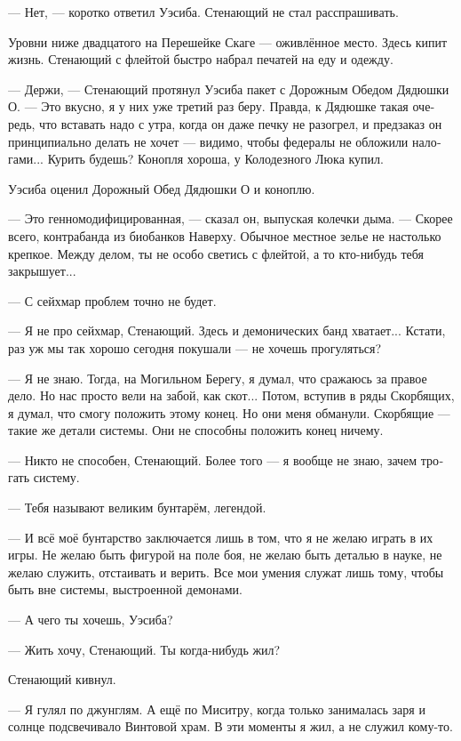 \documentclass[a4paper,12pt,fleqn]{book}\usepackage{cooltooltips}\usepackage{polyglossia}\setdefaultlanguage[babelshorthands=true]{russian}\setotherlanguage{english}\defaultfontfeatures{Ligatures=TeX,Mapping=tex-text} \usepackage{xcolor}\definecolor{lightgray}{HTML}{bbbbbb}\color{lightgray}\newcommand{\ml}[3]{\textenglish{\textcolor{black}{#3}}}
\newcommand{\asterism}{\vspace{1em}{\centering\Large\bfseries$\ast~\ast~\ast$\par}\vspace{1em}}
\begin{document}
--- Нет, --- коротко ответил Уэсиба.
Стенающий не стал расспрашивать.

\asterism

Уровни ниже двадцатого на Перешейке Скаге --- оживлённое место.
Здесь кипит жизнь.
Стенающий с флейтой быстро набрал печатей на еду и одежду.

--- Держи, --- Стенающий протянул Уэсиба пакет с Дорожным Обедом Дядюшки О.
--- Это вкусно, я у них уже третий раз беру.
Правда, к Дядюшке такая очередь, что вставать надо с утра, когда он даже печку не разогрел, и предзаказ он принципиально делать не хочет --- видимо, чтобы федералы не обложили налогами...
Курить будешь?
Конопля хороша, у Колодезного Люка купил.

Уэсиба оценил Дорожный Обед Дядюшки О и коноплю.

--- Это генномодифицированная, --- сказал он, выпуская колечки дыма.
--- Скорее всего, контрабанда из биобанков Наверху.
Обычное местное зелье не настолько крепкое.
Между делом, ты не особо светись с флейтой, а то кто-нибудь тебя закрышует...

--- С сейхмар проблем точно не будет.

--- Я не про сейхмар, Стенающий.
Здесь и демонических банд хватает...
Кстати, раз уж мы так хорошо сегодня покушали --- не хочешь прогуляться?

\asterism

--- Я не знаю.
Тогда, на Могильном Берегу, я думал, что сражаюсь за правое дело.
Но нас просто вели на забой, как скот...
Потом, вступив в ряды Скорбящих, я думал, что смогу положить этому конец.
Но они меня обманули.
Скорбящие --- такие же детали системы.
Они не способны положить конец ничему.

--- Никто не способен, Стенающий.
Более того --- я вообще не знаю, зачем трогать систему.

--- Тебя называют великим бунтарём, легендой.

--- И всё моё бунтарство заключается лишь в том, что я не желаю играть в их игры.
Не желаю быть фигурой на поле боя, не желаю быть деталью в науке, не желаю служить, отстаивать и верить.
Все мои умения служат лишь тому, чтобы быть вне системы, выстроенной демонами.

--- А чего ты хочешь, Уэсиба?

--- Жить хочу, Стенающий.
Ты когда-нибудь жил?

Стенающий кивнул.

--- Я гулял по джунглям.
А ещё по Миситру, когда только занималась заря и солнце подсвечивало Винтовой храм.
В эти моменты я жил, а не служил кому-то.
\end{document}
